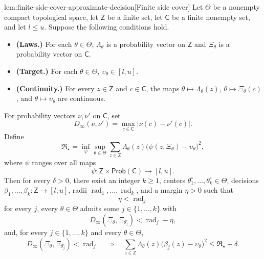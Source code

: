 \documentclass[11pt]{article}
\begin{document}
\begin{lemmav}{lem:finite-side-cover-approximate-decision}[Finite side cover]
Let \(\Theta\) be a nonempty compact topological space, let \(\mathsf Z\) be a finite set, let \(\mathsf C\) be a finite nonempty set, and let \(l\le u\). Suppose the following conditions hold.
\begin{itemize}
\item \textbf{(Laws.)} For each \(\theta\in\Theta\), \(\Lambda_\theta\) is a probability vector on \(\mathsf Z\) and \(\Xi_\theta\) is a probability vector on \(\mathsf C\).
\item \textbf{(Target.)} For each \(\theta\in\Theta\), \(\upsilon_\theta\in[l,u]\).
\item \textbf{(Continuity.)} For every \(z\in\mathsf Z\) and \(c\in\mathsf C\), the maps \(\theta\mapsto\Lambda_\theta(z)\), \(\theta\mapsto\Xi_\theta(c)\), and \(\theta\mapsto\upsilon_\theta\) are continuous.
\end{itemize}
For probability vectors \(\nu,\nu'\) on \(\mathsf C\), set
\[
D_\infty(\nu,\nu')=\max_{c\in\mathsf C}|\nu(c)-\nu'(c)|.
\]
Define
\[
\mathfrak R_\star
=
\inf_{\psi}\sup_{\theta\in\Theta}
\sum_{z\in\mathsf Z}\Lambda_\theta(z)
\bigl(\psi(z,\Xi_\theta)-\upsilon_\theta\bigr)^2,
\]
where \(\psi\) ranges over all maps
\[
\psi:\mathsf Z\times\mathsf{Prob}(\mathsf C)\to[l,u].
\]
Then for every \(\delta>0\), there exist an integer \(k\ge1\), centers
\(\theta^\circ_1,\ldots,\theta^\circ_k\in\Theta\), decisions
\(\beta_1,\ldots,\beta_k:\mathsf Z\to[l,u]\), radii
\(\operatorname{rad}_1,\ldots,\operatorname{rad}_k\), and a margin \(\eta>0\) such that
\[
\eta<\operatorname{rad}_j
\]
for every \(j\), every \(\theta\in\Theta\) admits some \(j\in\{1,\ldots,k\}\) with
\[
D_\infty(\Xi_\theta,\Xi_{\theta^\circ_j})<\operatorname{rad}_j-\eta,
\]
and, for every \(j\in\{1,\ldots,k\}\) and every \(\theta\in\Theta\),
\[
D_\infty(\Xi_\theta,\Xi_{\theta^\circ_j})<\operatorname{rad}_j
\quad\Longrightarrow\quad
\sum_{z\in\mathsf Z}\Lambda_\theta(z)
\bigl(\beta_j(z)-\upsilon_\theta\bigr)^2
\le
\mathfrak R_\star+\delta.
\]
\end{lemmav}
\end{document}
